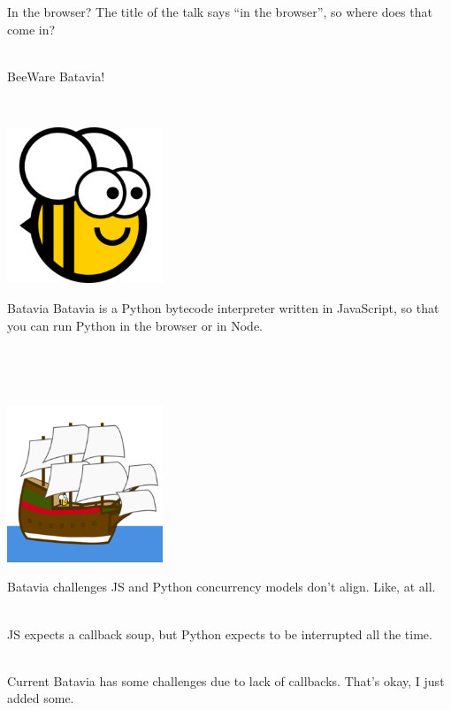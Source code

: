 \documentclass{beamer}
\begin{document}
\begin{frame}{In the browser?}
The title of the talk says ``in the browser'', so where does that come in?

\ \\

BeeWare Batavia!

\ \\

\begin{center}
  \includegraphics[width=0.35\textwidth]{brutus-270.png}
\end{center}

\end{frame}
\begin{frame}{Batavia}
Batavia is a Python bytecode interpreter written in JavaScript, so that you can run
Python in the browser or in Node.

\ \\


\ \\

\begin{center}
  \includegraphics[width=0.35\textwidth]{batavia.png}
\end{center}

\end{frame}
\begin{frame}{Batavia challenges}
JS and Python concurrency models don't align. Like, at all.

\ \\

JS expects a callback soup, but Python expects to be interrupted all the time.

\ \\

Current Batavia has some challenges due to lack of callbacks. That's okay, I just added some.
\end{frame}
\end{document}
